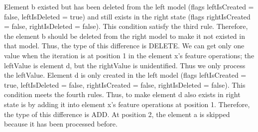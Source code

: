 \documentclass{jot}
\begin{document}
Element \textsf{b} existed but has been deleted from the left model (flags \textsf{leftIsCreated} = false, \textsf{leftIsDeleted} = true) and still exists in the right state (flags \textsf{rightIsCreated} = false, \textsf{rightIsDeleted} = false). This condition satisfy the third rule. Therefore, the element \textsf{b} should be deleted from the right model to make it not existed in that model. Thus, the type of this difference is \textsf{DELETE}. We can get only one value when the iteration is at position 1 in the element \textsf{x}'s feature \textsf{operations}; the \textsf{leftValue} is element \textsf{d}, but the \textsf{rightValue} is unidentified. Thus we only process the \textsf{leftValue}. Element \textsf{d} is only created in the left model (flags \textsf{leftIsCreated} = true, \textsf{leftIsDeleted} = false, \textsf{rightIsCreated} = false, \textsf{rightIsDeleted} = false). This condition meets the fourth rules. Thus, to make element \textsf{d} also exists in right state is by adding it into element \textsf{x}'s feature \textsf{operations} at position 1. Therefore, the type of this difference is \textsf{ADD}. At position 2, the element \textsf{a} is skipped because it has been processed before. 
\end{document}
